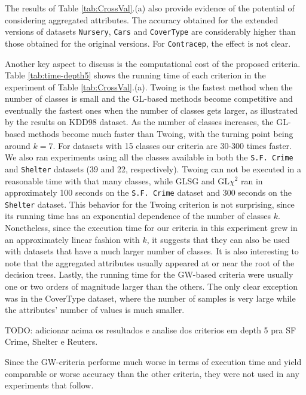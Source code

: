 The results of  Table \ref{tab:CrossVal}.(a) also
provide evidence of  the potential
of considering aggregated attributes. 
The accuracy obtained for the extended versions of datasets
{\tt Nursery}, {\tt Cars} and {\tt CoverType} are considerably higher than those obtained for 
the original versions. For {\tt Contracep}, the effect is not clear.

Another key aspect to discuss is the computational cost of the
proposed criteria. Table \ref{tab:time-depth5} shows the running time of each criterion in the experiment of Table \ref{tab:CrossVal}.(a). Twoing is the fastest method when the number of classes is small and the GL-based methods become competitive and eventually the
fastest ones when the number of classes gets larger, as illustrated by the results on KDD98 dataset. As the number of classes increases, the GL-based methods become much faster than Twoing, with the turning point being around $k=7$. For datasets with 15 classes our criteria are 30-300 times faster. We also ran experiments using all the classes available in both the {\tt S.F. Crime} and {\tt Shelter} datasets (39 and 22, respectively). Twoing can not be executed in a reasonable time with that many classes, while GLSG and GL$\chi^2$ ran in approximately 100 seconds on the {\tt S.F. Crime} dataset and  300 seconds on the {\tt Shelter} dataset.  This behavior for the Twoing criterion is not surprising, since its running time has an exponential dependence of the number of classes $k$. Nonetheless, since the execution time for our criteria in this experiment grew in an approximately linear fashion with $k$, it suggests that they can also be used with datasets that have a much larger number of classes. It is also interesting to note that the aggregated attributes usually appeared at or near the root of the decision trees. Lastly, the running time for the GW-based criteria were usually one or two orders of magnitude larger than the others. The only clear exception was in the CoverType dataset, where the number of samples is very large while the attributes’ number of values is much smaller.

TODO: adicionar acima os resultados e analise dos criterios em depth 5 pra SF Crime, Shelter e Reuters.

Since the GW-criteria performe much worse in terms of execution time and yield comparable or worse accuracy than the other criteria, they were not used in any experiments that follow.

